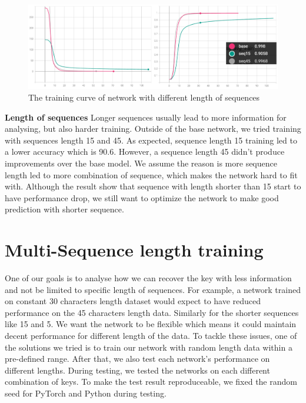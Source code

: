 \begin{figure}
    \centering
    \includegraphics[width=0.9\linewidth]{myReport//figures/seq_curve.png}
    \caption{The training curve of network with different length of sequences}
    \label{fig:enter-label}
\end{figure}


\noindent\textbf{Length of sequences} \qquad		Longer sequences usually lead to more information for analysing, but also harder training. Outside of the base network, we tried training with sequences length 15 and 45. As expected, sequence length 15 training led to a lower accuracy which is 90.6. However, a sequence length 45 didn’t produce improvements over the base model. We assume the reason is more sequence length led to more combination of sequence, which makes the network hard to fit with. Although the result show that sequence with length shorter than 15 start to have performance drop, we still want to optimize the network to make good prediction with shorter sequence.


\section{Multi-Sequence length training}

One of our goals is to analyse how we can recover the key with less information and not be limited to specific length of sequences. For example, a network trained on constant 30 characters length dataset would expect to have reduced performance on the 45 characters length data. Similarly for the shorter sequences like 15 and 5. We want the network to be flexible which means it could maintain decent performance for different length of the data. To tackle these issues, one of the solutions we tried is to train our network with random length data within a pre-defined range. After that, we also test each network’s performance on different lengths. 
During testing, we tested the networks on each different combination of keys. To make the test result reproduceable, we fixed the random seed for PyTorch and Python during testing. 


